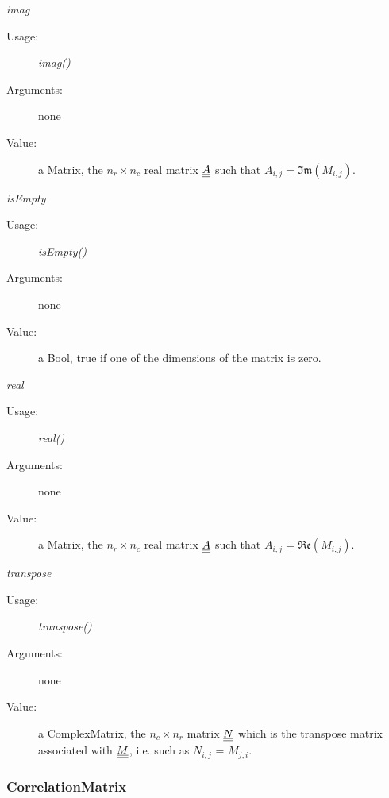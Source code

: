 \begin{description}
\begin{description}
\item \textit{imag}
\begin{description}
\item[Usage:] \textit{imag()}
\item[Arguments:] none
\item[Value:] a Matrix, the $n_r\times n_c$ real matrix ${\underline{\underline{A}}}$ such that $A_{i,j}=\mathfrak{Im}(M_{i,j})$.
\end{description}
\bigskip

\item \textit{isEmpty}
\begin{description}
\item[Usage:] \textit{isEmpty()}
\item[Arguments:] none
\item[Value:] a Bool, true if one of the dimensions of the matrix is zero.
\end{description}
\bigskip

\item \textit{real}
\begin{description}
\item[Usage:] \textit{real()}
\item[Arguments:] none
\item[Value:] a Matrix, the $n_r\times n_c$ real matrix ${\underline{\underline{A}}}$ such that $A_{i,j}=\mathfrak{Re}(M_{i,j})$.
\end{description}
\bigskip

\item \textit{transpose}
\begin{description}
\item[Usage:] \textit{transpose()}
\item[Arguments:] none
\item[Value:] a ComplexMatrix, the $n_c\times n_r$ matrix ${\underline{\underline{N}}}$ which is the transpose matrix associated with ${\underline{\underline{M}}}$, i.e.  such as $N_{i,j}$ = $M_{j,i}$.
\end{description}
\bigskip

\end{description}

\end{description}

\newpage
\subsubsection{CorrelationMatrix}

